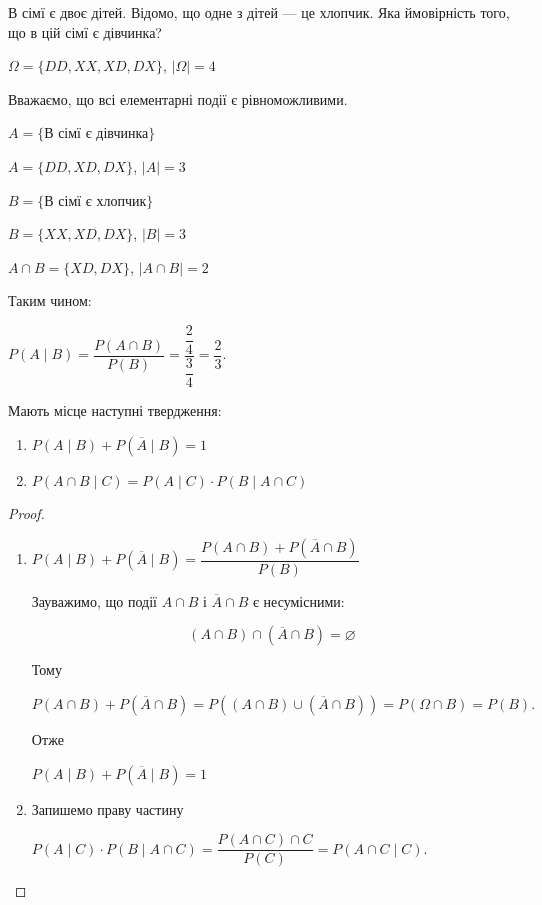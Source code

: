 \begin{example}
    В сімї є двоє дітей. Відомо, що одне з дітей --- це
    хлопчик. Яка ймовірність того, що в цій сімї є дівчинка?
    
    $\Omega = \{DD, XX, XD, DX\}$, $|\Omega| = 4$
    
    Вважаємо, що всі елементарні події є рівноможливими.
    
    $A = \{$В сімї є дівчинка$\}$
    
    $A = \{DD, XD, DX\}$, $|A| = 3$
    
    $B = \{$В сімї є хлопчик$\}$
    
    $B = \{XX, XD, DX\}$, $|B| = 3$
    
    $A \cap B = \{XD, DX\}$, $|A \cap B| = 2$
    
    Таким чином:
    
    $P(A \mid B)
    = \dfrac{P(A \cap B)}{P(B)}
    = \dfrac{\dfrac{2}{4}}{\dfrac{3}{4}}
    = \dfrac{2}{3}.$
\end{example}

\begin{claim}
    Мають місце наступні твердження:

    \begin{enumerate}
        \item $P(A \mid B) + P(\overline{A} \mid B) = 1$
        \item $P(A \cap B \mid C) = P(A \mid C) \cdot P(B \mid A \cap C)$
    \end{enumerate}
\end{claim}
\begin{proof}
    \begin{enumerate}
        \item $P(A \mid B) + P(\overline{A} \mid B)
        = \dfrac{P(A \cap B) + P(\overline{A} \cap B)}{P(B)}$
        
        Зауважимо, що події $A \cap B$ і $\overline{A} \cap B$ є несумісними:
        
        $$(A \cap B) \cap (\overline{A} \cap B) = \varnothing$$
        
        Тому
        
        $P(A \cap B) + P(\overline{A} \cap B)
        = P((A \cap B) \cup (\overline{A} \cap B))
        = P(\Omega \cap B)
        = P(B).$
        
        Отже
        
        $P(A \mid B) + P(\overline{A} \mid B) = 1$
        
        \item Запишемо праву частину
        
        $P(A \mid C) \cdot P(B \mid A \cap C)
        = \dfrac{P(A \cap C)\cap C}{P(C)}
        = P(A \cap C \mid C).$
    \end{enumerate}
\end{proof}

